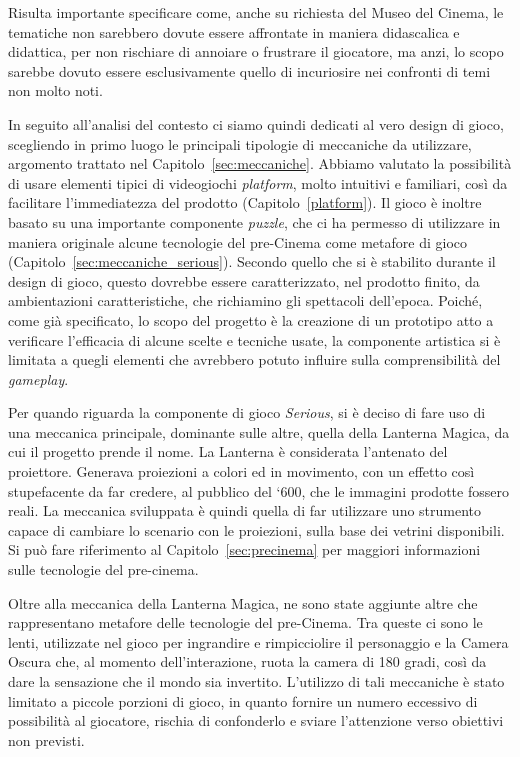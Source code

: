 Risulta importante specificare come, anche su richiesta del Museo del Cinema, le tematiche non sarebbero dovute essere affrontate in maniera didascalica e didattica, per non rischiare di annoiare o frustrare il giocatore, ma anzi, lo scopo sarebbe dovuto essere esclusivamente quello di incuriosire nei confronti di temi non molto noti.

In seguito all’analisi del contesto ci siamo quindi dedicati al vero design di gioco, scegliendo in primo luogo le principali tipologie di meccaniche da utilizzare, argomento trattato nel Capitolo~\ref{sec:meccaniche}. Abbiamo valutato la possibilità di usare elementi tipici di videogiochi \textit{platform}, molto intuitivi e familiari, così da facilitare l’immediatezza del prodotto (Capitolo~\ref{platform}). Il gioco è inoltre basato su una importante componente \textit{puzzle}, che ci ha permesso di utilizzare in maniera originale alcune tecnologie del pre-Cinema come metafore di gioco (Capitolo~\ref{sec:meccaniche_serious}).
Secondo quello che si è stabilito durante il design di gioco, questo dovrebbe essere caratterizzato, nel prodotto finito, da ambientazioni caratteristiche, che richiamino gli spettacoli dell’epoca. Poiché, come già specificato, lo scopo del progetto è la creazione di un prototipo atto a verificare l’efficacia di alcune scelte e tecniche usate, la componente artistica si è limitata a quegli elementi che avrebbero potuto influire sulla comprensibilità del \textit{gameplay}.

Per quando riguarda la componente di gioco \textit{Serious}, si è deciso di fare uso di una meccanica principale, dominante sulle altre, quella della Lanterna Magica, da cui il progetto prende il nome. La Lanterna è considerata l’antenato del proiettore. Generava proiezioni a colori ed in movimento, con un effetto così stupefacente da far credere, al pubblico del ‘600, che le immagini prodotte fossero reali. La meccanica sviluppata è quindi quella di far utilizzare uno strumento capace di cambiare lo scenario con le proiezioni, sulla base dei vetrini disponibili. Si può fare riferimento al Capitolo~\ref{sec:precinema} per maggiori informazioni sulle tecnologie del pre-cinema.

Oltre alla meccanica della Lanterna Magica, ne sono state aggiunte altre che rappresentano metafore delle tecnologie del pre-Cinema. Tra queste ci sono le lenti, utilizzate nel gioco per ingrandire e rimpicciolire il personaggio e la Camera Oscura che, al momento dell’interazione, ruota la camera di 180 gradi, così da dare la sensazione che il mondo sia invertito. L’utilizzo di tali meccaniche è stato limitato a piccole porzioni di gioco, in quanto fornire un numero eccessivo di possibilità al giocatore, rischia di confonderlo e sviare l’attenzione verso obiettivi non previsti.

